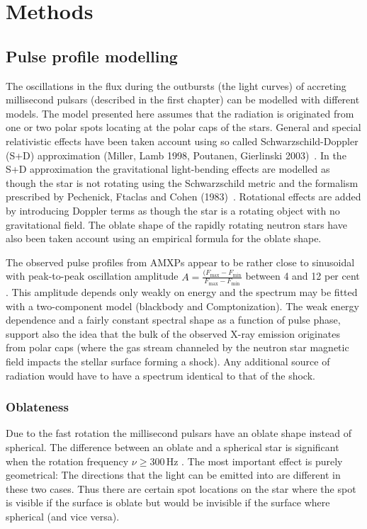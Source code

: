 \documentclass{wihuri}
\begin{document}
\fi

\section{Methods}

\subsection{Pulse profile modelling}

The oscillations in the flux during the outbursts (the light curves) of accreting millisecond pulsars (described in the first chapter) can be modelled with different models. The model presented here assumes that the radiation is originated from one or two polar spots locating at the polar caps of the stars. General and special relativistic effects have been taken account using so called Schwarzschild-Doppler (S+D) approximation (Miller, Lamb 1998, Poutanen, Gierlinski 2003)~\cite{poutagierlinskisax}. In the S+D approximation the gravitational light-bending effects are modelled as though the star is not rotating using the Schwarzschild metric and the formalism prescribed by
Pechenick, Ftaclas and Cohen (1983)~\cite{pechenick}. 
Rotational effects are added by introducing Doppler terms as though the star is a rotating object with no gravitational field. The oblate shape of the rapidly rotating neutron stars have also been taken account using an empirical formula for the oblate shape.

The observed pulse profiles from AMXPs appear to be rather close to sinusoidal with peak-to-peak oscillation amplitude $A = \frac{(F_{\mathrm{max}} - F_{\mathrm{min}}} {F_{\mathrm{max}} - F_{\mathrm{min}}}$ between 4 and 12 per cent \cite{poutarew2006}. This amplitude depends only weakly on energy and the spectrum may be fitted with a two-component model (blackbody and Comptonization). The weak energy dependence and a fairly constant spectral shape as a function of pulse phase, support also the idea that the bulk of the observed X-ray emission originates from polar caps (where the gas stream channeled by the neutron star magnetic field impacts the stellar surface forming a shock). Any additional source of radiation would have to have a spectrum identical to that of the shock.


\subsubsection{Oblateness}

Due to the fast rotation the millisecond pulsars have an oblate shape instead of spherical. The difference between an oblate and a spherical star is significant when the rotation frequency $\nu \ge 300 \, \mathrm{Hz}$ %
. The most important effect is purely geometrical: The directions that the light can be emitted into are different in these two cases. Thus there are certain spot locations on the star where the spot is visible if the surface is oblate but would be invisible if the surface where spherical (and vice versa).
\end{document}

